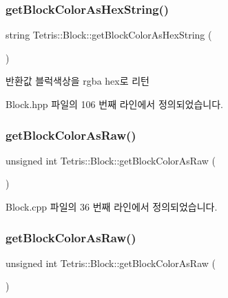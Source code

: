 \subsubsection{\texorpdfstring{get\+Block\+Color\+As\+Hex\+String()}{getBlockColorAsHexString()}\hspace{0.1cm}{\footnotesize\ttfamily [2/2]}}
{\footnotesize\ttfamily string Tetris\+::\+Block\+::get\+Block\+Color\+As\+Hex\+String (\begin{DoxyParamCaption}{ }\end{DoxyParamCaption})\hspace{0.3cm}{\ttfamily [inline]}}

\begin{DoxyReturn}{반환값}
블럭색상을 rgba hex로 리턴 
\end{DoxyReturn}


Block.\+hpp 파일의 106 번째 라인에서 정의되었습니다.

\mbox{\label{class_tetris_1_1_block_a8f6bd5020dcfdae501f74b42827344f3}} 
\subsubsection{\texorpdfstring{get\+Block\+Color\+As\+Raw()}{getBlockColorAsRaw()}\hspace{0.1cm}{\footnotesize\ttfamily [1/2]}}
{\footnotesize\ttfamily unsigned int Tetris\+::\+Block\+::get\+Block\+Color\+As\+Raw (\begin{DoxyParamCaption}{ }\end{DoxyParamCaption})}



Block.\+cpp 파일의 36 번째 라인에서 정의되었습니다.

\mbox{\label{class_tetris_1_1_block_a8f6bd5020dcfdae501f74b42827344f3}} 
\subsubsection{\texorpdfstring{get\+Block\+Color\+As\+Raw()}{getBlockColorAsRaw()}\hspace{0.1cm}{\footnotesize\ttfamily [2/2]}}
{\footnotesize\ttfamily unsigned int Tetris\+::\+Block\+::get\+Block\+Color\+As\+Raw (\begin{DoxyParamCaption}{ }\end{DoxyParamCaption})\hspace{0.3cm}{\ttfamily [inline]}}

